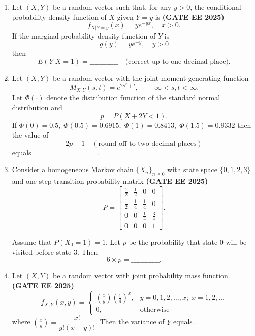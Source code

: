 \documentclass[journal,12pt,onecolumn]{IEEEtran}
\theoremstyle{remark}
\begin{document}
\begin{enumerate}
\item Let $(X,Y)$ be a random vector such that, for any $y > 0$, the conditional probability density function of $X$ given $Y = y$ is \hfill \textbf{(GATE EE 2025)}
\[
f_{X|Y=y}(x) = y e^{-yx}, \quad x > 0.
\] 
If the marginal probability density function of $Y$ is 
\[
g(y) = y e^{-y}, \quad y > 0
\] 
then 
\[
E(Y|X = 1) = \_\_\_\_\_\_\_\_\_\_\_\_ \quad \text{(correct up to one decimal place).}
\]

\item Let $(X,Y)$ be a random vector with the joint moment generating function 
\[
M_{X,Y}(s,t) = e^{2s^{2} + t}, \quad -\infty < s,t < \infty.
\] 
Let $\Phi(\cdot)$ denote the distribution function of the standard normal distribution and 
\[
p = P(X + 2Y < 1).
\] 
If $\Phi(0) = 0.5, \; \Phi(0.5) = 0.6915, \; \Phi(1) = 0.8413, \; \Phi(1.5) = 0.9332$ then the value of 
\[
2p + 1 \quad (\text{round off to two decimal places})
\] 
equals \_\_\_\_\_\_\_\_\_\_\_\_.

\item Consider a homogeneous Markov chain $\{X_n\}_{n \geq 0}$ with state space $\{0,1,2,3\}$ and one-step transition probability matrix \hfill \textbf{(GATE EE 2025)}
\[
P = \begin{bmatrix}
\frac{1}{2} & \frac{1}{2} & 0 & 0 \\
\frac{1}{2} & \frac{1}{4} & \frac{1}{4} & 0 \\
0 & 0 & \frac{1}{4} & \frac{3}{4} \\
0 & 0 & 0 & 1
\end{bmatrix}.
\]

Assume that $P(X_0 = 1) = 1$. Let $p$ be the probability that state $0$ will be visited before state $3$. Then 
\[
6 \times p = \_\_\_\_\_\_\_\_\_\_\_\_.
\]

\item Let $(X,Y)$ be a random vector with joint probability mass function \hfill \textbf{(GATE EE 2025)}
\[
f_{X,Y}(x,y) = 
\begin{cases}
\binom{x}{y} \left(\tfrac{1}{4}\right)^x, & y = 0,1,2,\ldots,x; \; x=1,2,\ldots \\
0, & \text{otherwise}
\end{cases}
\]
where $\binom{x}{y} = \dfrac{x!}{y!(x-y)!}$. Then the variance of $Y$ equals \underline{\hspace{3cm}}. \\[1em]



\end{enumerate}
\end{document}
